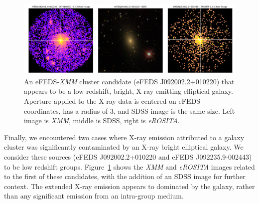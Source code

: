\documentclass[fleqn,usenatbib]{mnras}
\begin{document}
\begin{figure}
    \centering
    \includegraphics[width=1\textwidth]{images/elliptical_xray.png}
    \caption[]{An eFEDS-{\em XMM} cluster candidate (eFEDS J092002.2+010220) that appears to be a low-redshift, bright, X-ray emitting elliptical galaxy. Aperture applied to the X-ray data is centered on eFEDS coordinates, has a radius of 3\arcmin, and SDSS image is the same size. Left image is {\em XMM}, middle is SDSS, right is {\em eROSITA}.}
    \label{fig:ellipticalxray}
\end{figure}

Finally, we encountered two cases where X-ray emission attributed to a galaxy cluster was significantly contaminated by an X-ray bright elliptical galaxy. We consider these sources (eFEDS J092002.2+010220 and eFEDS J092235.9-002443) to be low redshift groups.  Figure~\ref{fig:ellipticalxray} shows the {\em XMM} and {\em eROSITA} images related to the first of these candidates, with the addition of an SDSS image for further context. The extended X-ray emission appears to dominated by the galaxy, rather than any significant emission from an intra-group medium.


\end{document}
